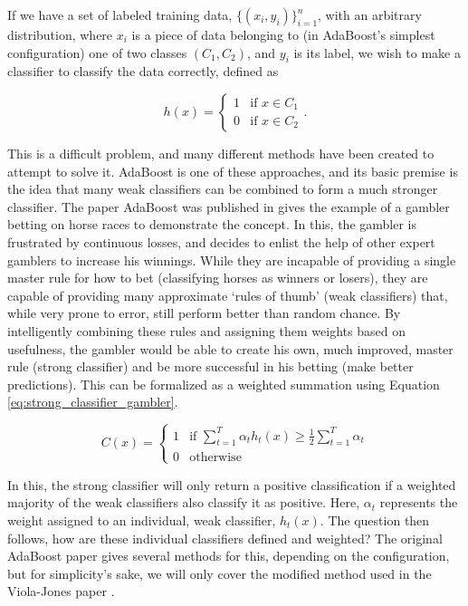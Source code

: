 \documentclass[11pt,a4paper,oldfontcommands]{memoir}
\begin{document}
If we have a set of labeled training data, $\big\{(x_i, y_i)\big\}_{i=1}^{n}$, with an arbitrary distribution, where $x_i$ is a piece of data belonging to (in AdaBoost's simplest configuration) one of two classes $(C_1, C_2)$, and $y_i$ is its label, we wish to make a classifier to classify the data correctly, defined as

\begin{equation}
    h(x) = 
    \begin{cases} 
        1 & \textrm{if  } x \in C_1\\ 
        0 & \textrm{if  } x \in C_2
    \end{cases} .
\end{equation}

This is a difficult problem, and many different methods have been created to attempt to solve it. AdaBoost is one of these approaches, and its basic premise is the idea that many weak classifiers can be combined to form a much stronger classifier. The paper AdaBoost was published in \cite{adaboost} gives the example of a gambler betting on horse races to demonstrate the concept. In this, the gambler is frustrated by continuous losses, and decides to enlist the help of other expert gamblers to increase his winnings. While they are incapable of providing a single master rule for how to bet (classifying horses as winners or losers), they are capable of providing many approximate `rules of thumb' (weak classifiers) that, while very prone to error, still perform better than random chance. By intelligently combining these rules and assigning them weights based on usefulness, the gambler would be able to create his own, much improved, master rule (strong classifier) and be more successful in his betting (make better predictions). This can be formalized as a weighted summation using Equation \ref{eq:strong_classifier_gambler}. 

\begin{equation}
    C(x) = 
    \begin{cases} 
        1 & \textrm{if  } \sum\limits_{t=1}^T \alpha_t h_t(x) \geq \frac{1}{2} \sum\limits_{t=1}^T \alpha_t \\ 
        0 & \textrm{otherwise}
    \end{cases}
    \label{eq:strong_classifier_gambler}
\end{equation}

In this, the strong classifier will only return a positive classification if a weighted majority of the weak classifiers also classify it as positive. Here, $\alpha_t$ represents the weight assigned to an individual, weak classifier, $h_t(x)$. The question then follows, how are these individual classifiers defined and weighted? The original AdaBoost paper \cite{adaboost} gives several methods for this, depending on the configuration, but for simplicity's sake, we will only cover the modified method used in the Viola-Jones paper \cite{viola}\cite{viola_updated}. 
\end{document}
